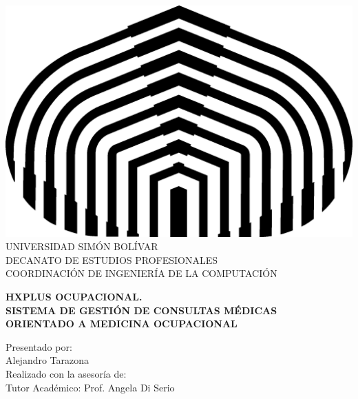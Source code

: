\begin{titlepage}
    \begin{center}
        
        \includegraphics[scale=0.5]{figures/logo} \\
        
        \textsc {\large UNIVERSIDAD SIM\'ON BOL\'IVAR} \\
        \textsc{DECANATO DE ESTUDIOS PROFESIONALES\\
            COORDINACI\'ON DE INGENIER\'IA DE LA COMPUTACI\'ON}
        
        \bigskip
        \bigskip
        \bigskip
        \bigskip
        \bigskip
        \bigskip

        \textsc{\bfseries HXPLUS OCUPACIONAL.\\
            SISTEMA DE GESTIÓN DE CONSULTAS MÉDICAS\\
             ORIENTADO A MEDICINA OCUPACIONAL}
        
        \bigskip
        \bigskip
        \bigskip
        \bigskip
        \vfill
        
        \begin{minipage}{\textwidth}
            \centering
            Presentado por: \\
            Alejandro Tarazona \\
            
            Realizado con la asesoría de:\\
            
            Tutor Académico: Prof. Angela Di Serio\\
            

\end{minipage}
\end{center}
\end{titlepage}
